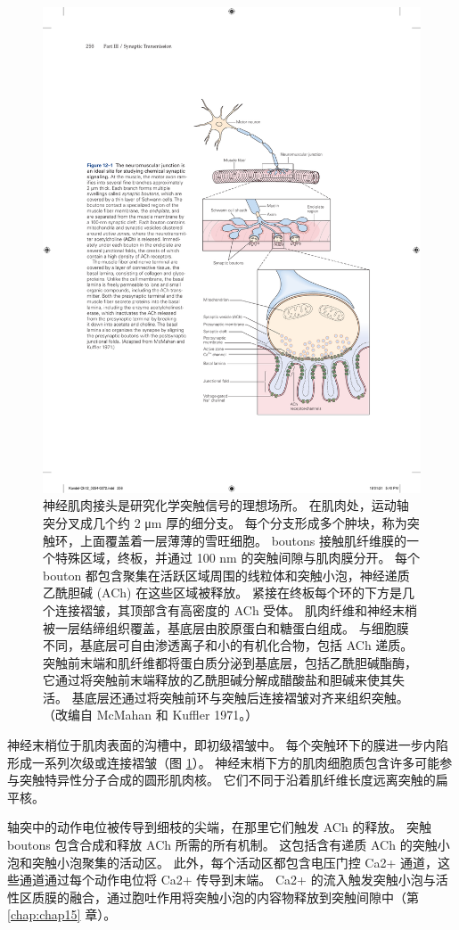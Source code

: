 \begin{figure}[htbp]
	\centering
	\includegraphics[width=0.6\linewidth]{chap12/fig_12_1}
	\caption{神经肌肉接头是研究化学突触信号的理想场所。 在肌肉处，运动轴突分叉成几个约 2 μm 厚的细分支。 每个分支形成多个肿块，称为突触环，上面覆盖着一层薄薄的雪旺细胞。 boutons 接触肌纤维膜的一个特殊区域，终板，并通过 100 nm 的突触间隙与肌肉膜分开。 每个 bouton 都包含聚集在活跃区域周围的线粒体和突触小泡，神经递质乙酰胆碱 (ACh) 在这些区域被释放。 紧接在终板每个环的下方是几个连接褶皱，其顶部含有高密度的 ACh 受体。 肌肉纤维和神经末梢被一层结缔组织覆盖，基底层由胶原蛋白和糖蛋白组成。 与细胞膜不同，基底层可自由渗透离子和小的有机化合物，包括 ACh 递质。 突触前末端和肌纤维都将蛋白质分泌到基底层，包括乙酰胆碱酯酶，它通过将突触前末端释放的乙酰胆碱分解成醋酸盐和胆碱来使其失活。 基底层还通过将突触前环与突触后连接褶皱对齐来组织突触。 （改编自 McMahan 和 Kuffler 1971。）}
	\label{fig:12_1}
\end{figure}


神经末梢位于肌肉表面的沟槽中，即初级褶皱中。 
每个突触环下的膜进一步内陷形成一系列次级或连接褶皱（图 \ref{fig:12_1}）。 
神经末梢下方的肌肉细胞质包含许多可能参与突触特异性分子合成的圆形肌肉核。 
它们不同于沿着肌纤维长度远离突触的扁平核。


轴突中的动作电位被传导到细枝的尖端，在那里它们触发 ACh 的释放。 
突触 boutons 包含合成和释放 ACh 所需的所有机制。 
这包括含有递质 ACh 的突触小泡和突触小泡聚集的活动区。 
此外，每个活动区都包含电压门控 Ca2+ 通道，这些通道通过每个动作电位将 Ca2+ 传导到末端。 
Ca2+ 的流入触发突触小泡与活性区质膜的融合，通过胞吐作用将突触小泡的内容物释放到突触间隙中（第 \ref{chap:chap15} 章）。


